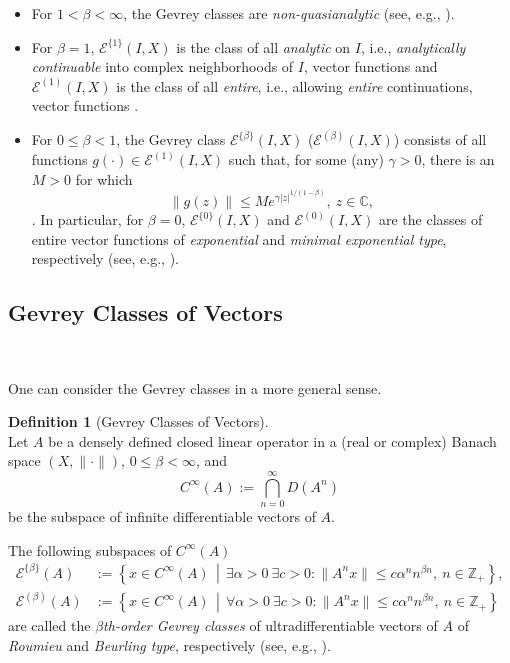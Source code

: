 \documentclass{amsart}
\theoremstyle{plain}
\theoremstyle{definition}
\newtheorem{defn}{Definition}[section]
\begin{document}
\begin{itemize}
\item For $1<\beta<\infty$, the Gevrey classes
are \textit{non-quasianalytic} (see, e.g., \cite{Komatsu2}).
\item For $\beta=1$, ${\mathscr E}^{\{1\}}(I,X)$ 
is the class of all {\it analytic} on $I$, i.e., {\it analytically continuable} into complex neighborhoods of $I$, vector functions and ${\mathscr E}^{(1)}(I,X)$ is the class of all {\it entire}, i.e., allowing {\it entire} continuations, vector functions \cite{Mandel}.
\item For $0\le\beta<1$, the Gevrey class ${\mathscr E}^{\{\beta\}}(I,X)$ (${\mathscr E}^{(\beta)}(I,X)$) consists of all functions $g(\cdot)\in {\mathscr E}^{(1)}(I,X)$ such that, for some (any) $\gamma>0$, there is an $M>0$ for which
\begin{equation}\label{order}
\|g(z)\|\le Me^{\gamma|z|^{1/(1-\beta)}},\ z\in {{\mathbb C}},
\end{equation}
\cite{Markin2001(2)}. In particular,
for $\beta=0$, ${\mathscr E}^{\{0\}}(I,X)$ and ${\mathscr E}^{(0)}(I,X)$ are the classes of entire vector functions of \textit{exponential} and \textit{minimal exponential type}, respectively (see, e.g., \cite{Levin}).
\end{itemize} 

\subsection{Gevrey Classes of Vectors}\

One can consider the Gevrey classes in a more general sense. 

\begin{defn}[Gevrey Classes of Vectors]\ \\
Let $A$ be a densely defined closed linear operator in a (real or complex) Banach space $(X,\|\cdot\|)$, $0\le \beta<\infty$, and
\begin{equation*}
C^{\infty}(A):=\bigcap_{n=0}^{\infty}D(A^n)
\end{equation*}
be the subspace of infinite differentiable vectors of $A$.

The following subspaces of $C^{\infty}(A)$
\begin{align*}
{\mathscr E}^{\{\beta\}}(A)&:=\left\{x\in C^{\infty}(A)\, \middle |\, 
\exists \alpha>0\ \exists c>0:
\|A^nx\| \le c\alpha^n n^{\beta n},\ n\in{{\mathbb Z}}_+ \right\},\\
{\mathscr E}^{(\beta)}(A)&:=\left\{x \in C^{\infty}(A)\, \middle|\,\forall \alpha > 0 \ \exists c>0:
\|A^nx\| \le c\alpha^n n^{\beta n},\ n\in{{\mathbb Z}}_+ \right\}
\end{align*}
are called the \textit{$\beta$th-order Gevrey classes} of ultradifferentiable vectors of $A$ of \textit{Roumieu} and \textit{Beurling type}, respectively (see, e.g., \cite{GorV83,Gor-Knyaz,book}).
\end{defn}
\end{document}
